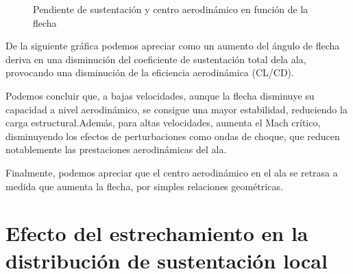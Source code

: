 \documentclass[9pt, a4paper]{article}
\begin{document}
\begin{figure}[H]
  \caption{Pendiente de sustentación y centro aerodinámico en función de la flecha}
  \label{fig:hw2_2}
\end{figure}

De la siguiente gráfica podemos apreciar como un aumento del ángulo de flecha deriva en una disminución del coeficiente de sustentación total dela ala, provocando una disminución de la eficiencia aerodinámica (CL/CD).

Podemos concluir que, a bajas velocidades, aunque la flecha disminuye su capacidad a nivel aerodinámico, se consigue una mayor estabilidad, reduciendo la carga estructural.Además, para altas velocidades, aumenta el Mach crítico, disminuyendo los efectos de perturbaciones como ondas de choque, que reducen notablemente las prestaciones aerodinámicas del ala.

Finalmente, podemos apreciar que el centro aerodinámico en el ala se retrasa a medida que aumenta la flecha, por simples relaciones geométricas.

\section{Efecto del estrechamiento en la distribución de sustentación local}
\end{document}
